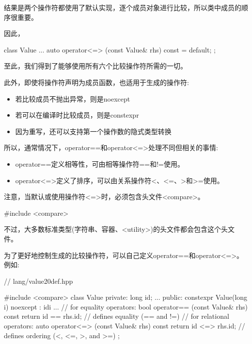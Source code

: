 结果是两个操作符都使用了默认实现，逐个成员对象进行比较，所以类中成员的顺序很重要。

因此，

\begin{cpp}
class Value {
	...
	auto operator<=> (const Value& rhs) const = default;
};
\end{cpp}

至此，我们得到了能够使用所有六个比较操作符所需的一切。

此外，即使将操作符声明为成员函数，也适用于生成的操作符:

\begin{itemize}
\item
若比较成员不抛出异常，则是noexcept

\item
若可以在编译时比较成员，则是constexpr

\item
因为重写，还可以支持第一个操作数的隐式类型转换
\end{itemize}

所以，通常情况下，operator==和operator<=>处理不同但相关的事情:

\begin{itemize}
\item
operator==定义相等性，可由相等操作符==和!=使用。

\item
operator<=>定义了排序，可以由关系操作符<、<=、>和>=使用。
\end{itemize}

注意，当默认或使用操作符<=>时，必须包含头文件<compare>。

\begin{cpp}
#include <compare>
\end{cpp}

不过，大多数标准类型(字符串、容器、<utility>)的头文件都会包含这个头文件。


为了更好地控制生成的比较操作符，可以自己定义operator==和operator<=>。例如:

\begin{cpp}
// lang/value20def.hpp

#include <compare>
class Value {
private:
	long id;
	...
public:
	constexpr Value(long i) noexcept
	: id{i} {
	}
	...
	// for equality operators:
	bool operator== (const Value& rhs) const {
		return id == rhs.id; // defines equality (== and !=)
	}
	// for relational operators:
	auto operator<=> (const Value& rhs) const {
		return id <=> rhs.id; // defines ordering (<, <=, >, and >=)
	}
};
\end{cpp}

